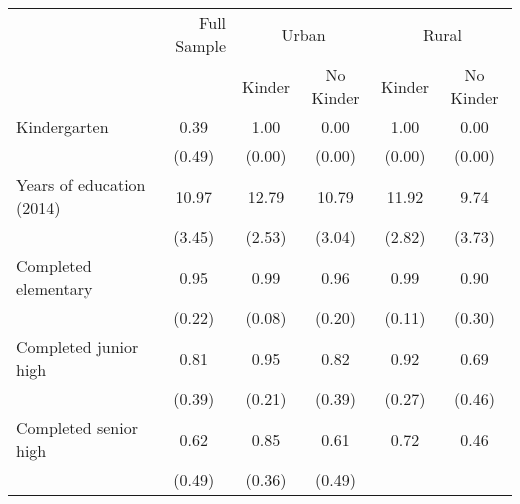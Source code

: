 \begin{tabular}{llllll}
\cline{1-6}
\multicolumn{1}{c}{} &
  \multicolumn{1}{|r}{Full Sample} &
  \multicolumn{2}{c}{Urban} &
  \multicolumn{2}{c}{Rural} \\
\multicolumn{1}{c}{} &
  \multicolumn{1}{|r}{} &
  \multicolumn{1}{c}{Kinder} &
  \multicolumn{1}{c}{No Kinder} &
  \multicolumn{1}{c}{Kinder} &
  \multicolumn{1}{c}{No Kinder} \\
\cline{1-6}
\multicolumn{1}{l}{Kindergarten} &
  \multicolumn{1}{|c}{0.39} &
  \multicolumn{1}{c}{1.00} &
  \multicolumn{1}{c}{0.00} &
  \multicolumn{1}{c}{1.00} &
  \multicolumn{1}{c}{0.00} \\
\multicolumn{1}{l}{} &
  \multicolumn{1}{|c}{(0.49)} &
  \multicolumn{1}{c}{(0.00)} &
  \multicolumn{1}{c}{(0.00)} &
  \multicolumn{1}{c}{(0.00)} &
  \multicolumn{1}{c}{(0.00)} \\
\multicolumn{1}{l}{Years of education (2014)} &
  \multicolumn{1}{|c}{10.97} &
  \multicolumn{1}{c}{12.79} &
  \multicolumn{1}{c}{10.79} &
  \multicolumn{1}{c}{11.92} &
  \multicolumn{1}{c}{9.74} \\
\multicolumn{1}{l}{} &
  \multicolumn{1}{|c}{(3.45)} &
  \multicolumn{1}{c}{(2.53)} &
  \multicolumn{1}{c}{(3.04)} &
  \multicolumn{1}{c}{(2.82)} &
  \multicolumn{1}{c}{(3.73)} \\
\multicolumn{1}{l}{Completed elementary} &
  \multicolumn{1}{|c}{0.95} &
  \multicolumn{1}{c}{0.99} &
  \multicolumn{1}{c}{0.96} &
  \multicolumn{1}{c}{0.99} &
  \multicolumn{1}{c}{0.90} \\
\multicolumn{1}{l}{} &
  \multicolumn{1}{|c}{(0.22)} &
  \multicolumn{1}{c}{(0.08)} &
  \multicolumn{1}{c}{(0.20)} &
  \multicolumn{1}{c}{(0.11)} &
  \multicolumn{1}{c}{(0.30)} \\
\multicolumn{1}{l}{Completed junior high} &
  \multicolumn{1}{|c}{0.81} &
  \multicolumn{1}{c}{0.95} &
  \multicolumn{1}{c}{0.82} &
  \multicolumn{1}{c}{0.92} &
  \multicolumn{1}{c}{0.69} \\
\multicolumn{1}{l}{} &
  \multicolumn{1}{|c}{(0.39)} &
  \multicolumn{1}{c}{(0.21)} &
  \multicolumn{1}{c}{(0.39)} &
  \multicolumn{1}{c}{(0.27)} &
  \multicolumn{1}{c}{(0.46)} \\
\multicolumn{1}{l}{Completed senior high} &
  \multicolumn{1}{|c}{0.62} &
  \multicolumn{1}{c}{0.85} &
  \multicolumn{1}{c}{0.61} &
  \multicolumn{1}{c}{0.72} &
  \multicolumn{1}{c}{0.46} \\
\multicolumn{1}{l}{} &
  \multicolumn{1}{|c}{(0.49)} &
  \multicolumn{1}{c}{(0.36)} &
  \multicolumn{1}{c}{(0.49)} &

\end{tabular}
